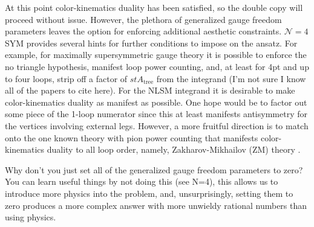 \documentclass[11pt,letter]{article}
\begin{document}

At this point color-kinematics duality has been satisfied, so the double copy will proceed without issue.
However, the plethora of generalized gauge freedom parameters leaves the option for enforcing additional aesthetic constraints.
$\mathcal{N}=4$ SYM provides several hints for further conditions to impose on the ansatz.
For example, for maximally supersymmetric gauge theory it is possible to enforce the no triangle hypothesis, manifest loop power counting, and, at least for 4pt and up to four loops, strip off a factor of $st A_\text{tree}$ from the integrand (I'm not sure I know all of the papers to cite here).
For the NLSM integrand it is desirable to make color-kinematics duality as manifest as possible.
One hope would be to factor out some piece of the 1-loop numerator since this at least manifests antisymmetry for the vertices involving external legs.
However, a more fruitful direction is to match onto the one known theory with pion power counting that manifests color-kinematics duality to all loop order, namely, Zakharov-Mikhailov (ZM) theory \cite{Zakharov:1973pp, Cheung:2022mix}.

Why don't you just set all of the generalized gauge freedom parameters to zero?
You can learn useful things by not doing this (see N=4), this allows us to introduce more physics into the problem, and, unsurprisingly, setting them to zero produces a more complex answer with more unwieldy rational numbers than using physics.
\end{document}
